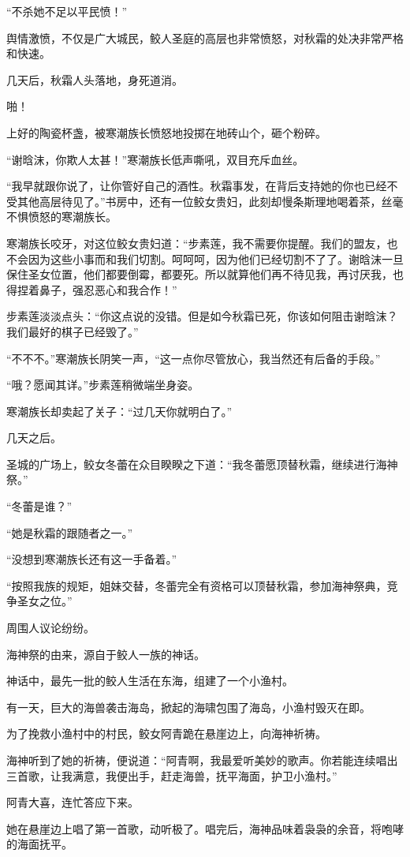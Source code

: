 \begin{this_body}
“不杀她不足以平民愤！”

舆情激愤，不仅是广大城民，鲛人圣庭的高层也非常愤怒，对秋霜的处决非常严格和快速。

几天后，秋霜人头落地，身死道消。

啪！

上好的陶瓷杯盏，被寒潮族长愤怒地投掷在地砖山个，砸个粉碎。

“谢晗沫，你欺人太甚！”寒潮族长低声嘶吼，双目充斥血丝。

“我早就跟你说了，让你管好自己的酒性。秋霜事发，在背后支持她的你也已经不受其他高层待见了。”书房中，还有一位鲛女贵妇，此刻却慢条斯理地喝着茶，丝毫不惧愤怒的寒潮族长。

寒潮族长咬牙，对这位鲛女贵妇道：“步素莲，我不需要你提醒。我们的盟友，也不会因为这些小事而和我们切割。呵呵呵，因为他们已经切割不了了。谢晗沫一旦保住圣女位置，他们都要倒霉，都要死。所以就算他们再不待见我，再讨厌我，也得捏着鼻子，强忍恶心和我合作！”

步素莲淡淡点头：“你这点说的没错。但是如今秋霜已死，你该如何阻击谢晗沫？我们最好的棋子已经毁了。”

“不不不。”寒潮族长阴笑一声，“这一点你尽管放心，我当然还有后备的手段。”

“哦？愿闻其详。”步素莲稍微端坐身姿。

寒潮族长却卖起了关子：“过几天你就明白了。”

几天之后。

圣城的广场上，鲛女冬蕾在众目睽睽之下道：“我冬蕾愿顶替秋霜，继续进行海神祭。”

“冬蕾是谁？”

“她是秋霜的跟随者之一。”

“没想到寒潮族长还有这一手备着。”

“按照我族的规矩，姐妹交替，冬蕾完全有资格可以顶替秋霜，参加海神祭典，竞争圣女之位。”

周围人议论纷纷。

海神祭的由来，源自于鲛人一族的神话。

神话中，最先一批的鲛人生活在东海，组建了一个小渔村。

有一天，巨大的海兽袭击海岛，掀起的海啸包围了海岛，小渔村毁灭在即。

为了挽救小渔村中的村民，鲛女阿青跪在悬崖边上，向海神祈祷。

海神听到了她的祈祷，便说道：“阿青啊，我最爱听美妙的歌声。你若能连续唱出三首歌，让我满意，我便出手，赶走海兽，抚平海面，护卫小渔村。”

阿青大喜，连忙答应下来。

她在悬崖边上唱了第一首歌，动听极了。唱完后，海神品味着袅袅的余音，将咆哮的海面抚平。


\end{this_body}
